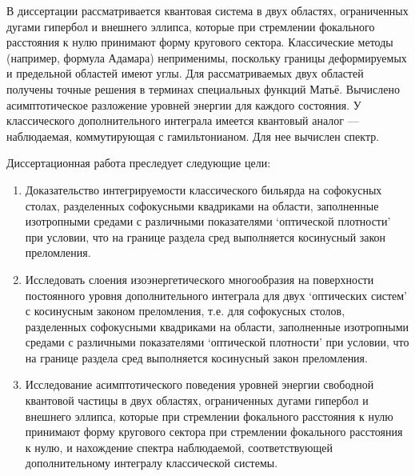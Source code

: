 В диссертации рассматривается квантовая система в двух областях, ограниченных дугами гипербол и внешнего эллипса, которые при стремлении фокального расстояния к нулю принимают форму кругового сектора.
Классические методы (например, формула Адамара) неприменимы, поскольку границы деформируемых и предельной областей имеют углы.
Для рассматриваемых двух областей получены точные решения в терминах специальных функций Матьё. Вычислено асимптотическое разложение уровней энергии для каждого состояния. У классического дополнительного интеграла имеется квантовый аналог --- наблюдаемая, коммутирующая с гамильтонианом. Для нее вычислен спектр.

{\aim} 
Диссертационная работа преследует следующие цели:
\begin{enumerate}[beginpenalty=10000] %
  \item Доказательство интегрируемости классического бильярда на софокусных столах, разделенных софокусными квадриками на области, заполненные изотропными средами с различными показателями `оптической плотности' при условии, что на границе раздела сред выполняется косинусный закон преломления.
 \item Исследовать слоения изоэнергетического многообразия на поверхности постоянного уровня дополнительного интеграла для двух `оптических систем' с косинусным законом преломления, т.е. для софокусных столов, разделенных софокусными квадриками на области, заполненные изотропными средами с различными показателями `оптической плотности'  при условии, что на границе раздела сред выполняется косинусный закон преломления.
   \item Исследование асимптотического поведения уровней энергии свободной квантовой частицы в двух областях, ограниченных дугами гипербол и внешнего эллипса, которые при стремлении фокального расстояния к нулю принимают форму кругового сектора при стремлении фокального расстояния к нулю, и нахождение спектра наблюдаемой, соответствующей дополнительному интегралу классической системы.
\end{enumerate}

